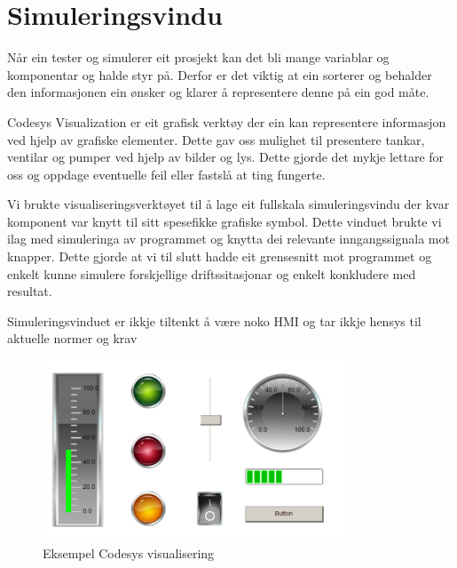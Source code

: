 \section{Simuleringsvindu}
\thispagestyle{fancy}

Når ein tester og simulerer eit prosjekt kan det bli mange variablar og komponentar
og halde styr på. Derfor er det viktig at ein sorterer og behalder den informasjonen ein
ønsker og klarer å representere denne på ein god måte.

Codesys Visualization er eit grafisk verktøy der ein kan representere informasjon
ved hjelp av grafiske elementer. Dette gav oss mulighet til presentere tankar, ventilar og pumper
ved hjelp av bilder og lys. 
Dette gjorde det mykje lettare for oss og oppdage eventuelle feil eller fastslå at ting fungerte.

Vi brukte visualiseringsverktøyet til å lage eit fullskala simuleringsvindu der kvar komponent
var knytt til sitt spesefikke grafiske symbol. Dette vinduet brukte vi ilag med simuleringa
av programmet og knytta dei relevante inngangssignala mot knapper. 
Dette gjorde at vi til slutt hadde eit grensesnitt mot programmet og enkelt kunne simulere
forskjellige driftssitasjonar og enkelt konkludere med resultat.

Simuleringsvinduet er ikkje tiltenkt å være noko 
\gls{HMI} og tar ikkje hensys til aktuelle normer og krav

\begin{figure}[htbp]
    \centering
    \includegraphics[width=0.8\textwidth]{Bilder/Codesys symbol.png}
    \caption{Eksempel Codesys visualisering}\label{fig:reaktorsoner}
\end{figure}

\newpage
